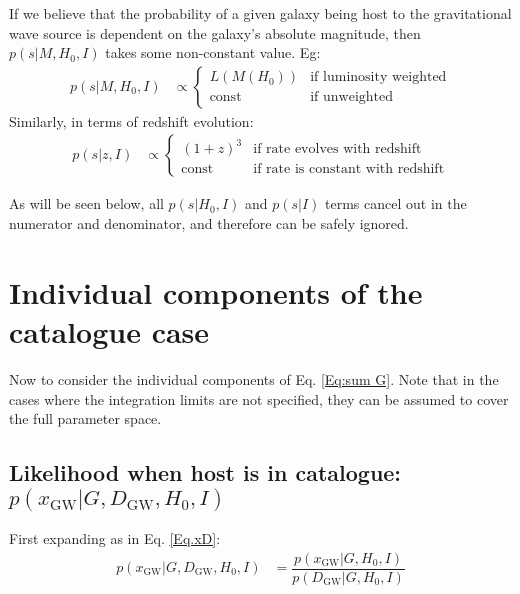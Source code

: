 \documentclass[a4paper,10pt]{article}
\begin{document}
If we believe that the probability of a given galaxy being host to the gravitational wave source is dependent on the galaxy's absolute magnitude, then $p(s|M,H_0,I)$ takes some non-constant value.  Eg:
\begin{equation}
\begin{aligned}
p(s|M,H_0,I) &\propto 
\begin{cases}
L(M(H_0)) & \text{if luminosity weighted}\\
\text{const} & \text{if unweighted}
\end{cases}
\end{aligned}
\end{equation}
Similarly, in terms of redshift evolution:
\begin{equation}
\begin{aligned}
p(s|z,I) &\propto 
\begin{cases}
(1+z)^3 & \text{if rate evolves with redshift}\\
\text{const} & \text{if rate is constant with redshift}
\end{cases}
\end{aligned}
\end{equation}

As will be seen below, all $p(s|H_0,I)$ and $p(s|I)$ terms cancel out in the numerator and denominator, and therefore can be safely ignored.






\section{Individual components of the catalogue case \label{Sec: Components}}
Now to consider the individual components of Eq. \ref{Eq:sum G}.  Note that in the cases where the integration limits are not specified, they can be assumed to cover the full parameter space.


\subsection{Likelihood when host is in catalogue: $p(x_{\text{GW}}|G,D_{\text{GW}},H_0,I)$}

First expanding as in Eq. \ref{Eq.xD}:
\begin{equation}
\label{Eq:x_GDH0}
\begin{aligned}
p(x_{\text{GW}}|G,D_{\text{GW}},H_0,I) &= \dfrac{p(x_{\text{GW}}|G,H_0,I)}{p(D_{\text{GW}}|G,H_0,I)}
\end{aligned}
\end{equation}
\end{document}
